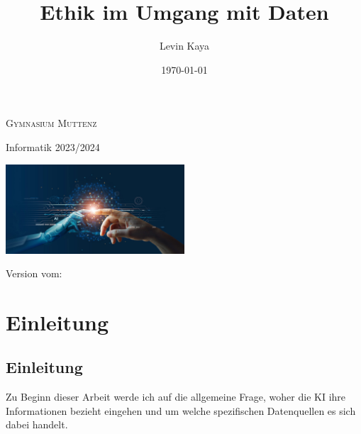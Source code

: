 \documentclass{report}
\title{Ethik im Umgang mit Daten}
\author{Levin Kaya}
\date{\today}
\begin{document}
\begin{titlepage}
    \makeatletter %
	\begin{center}
		{\scshape Gymnasium Muttenz} \vspace{0.5cm}
        
        Informatik 2023/2024\vspace{5.5cm}
        
		{\huge\bfseries \@title}
        
		\vspace{2cm}
        \includegraphics[width=0.5\textwidth]{KI.jpg}

		\vspace{2cm}

		{\Large\itshape \@author}

        \vspace{2cm}

        Version vom: \@date
	\end{center}
    
    \makeatother %
\end{titlepage}


\tableofcontents

\chapter{Einleitung}



\section{Einleitung}
Zu Beginn dieser Arbeit werde ich auf die allgemeine Frage, woher die KI ihre Informationen bezieht eingehen und um welche spezifischen Datenquellen es sich dabei handelt. 
\end{document}
